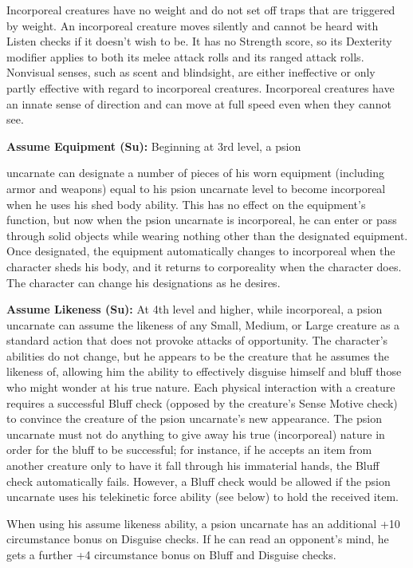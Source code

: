 \documentclass{article}
\begin{document}
Incorporeal creatures have no weight and do not set off traps that are triggered 
by weight. An incorporeal creature moves silently and cannot be heard with Listen 
checks if it doesn't wish to be. It has no Strength score, so its Dexterity modifier 
applies to both its melee attack rolls and its ranged attack rolls. Nonvisual senses, 
such as scent and blindsight, are either ineffective or only partly effective with 
regard to incorporeal creatures. Incorporeal creatures have an innate sense of 
direction and can move at full speed even when they cannot see.

\textbf{Assume Equipment (Su):} Beginning at 3rd level, a psion

uncarnate can designate a number of pieces of his worn equipment (including armor 
and weapons) equal to his psion uncarnate level to become incorporeal when he uses 
his shed body ability. This has no effect on the equipment's function, but now 
when the psion uncarnate is incorporeal, he can enter or pass through solid objects 
while wearing nothing other than the designated equipment. Once designated, the 
equipment automatically changes to incorporeal when the character sheds his body, 
and it returns to corporeality when the character does. The character can change 
his designations as he desires.

\textbf{Assume Likeness (Su):} At 4th level and higher, while incorporeal, a psion 
uncarnate can assume the likeness of any Small, Medium, or Large creature as a 
standard action that does not provoke attacks of opportunity. The character's abilities 
do not change, but he appears to be the creature that he assumes the likeness of, 
allowing him the ability to effectively disguise himself and bluff those who might 
wonder at his true nature. Each physical interaction with a creature requires a 
successful Bluff check (opposed by the creature's Sense Motive check) to convince 
the creature of the psion uncarnate's new appearance. The psion uncarnate must 
not do anything to give away his true (incorporeal) nature in order for the bluff 
to be successful; for instance, if he accepts an item from another creature only 
to have it fall through his immaterial hands, the Bluff check automatically fails. 
However, a Bluff check would be allowed if the psion uncarnate uses his telekinetic 
force ability (see below) to hold the received item.

When using his assume likeness ability, a psion uncarnate has an additional +10 
circumstance bonus on Disguise checks. If he can read an opponent's mind, he gets 
a further +4 circumstance bonus on Bluff and Disguise checks.
\end{document}

